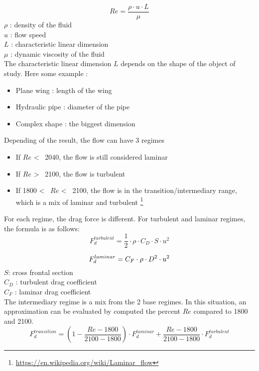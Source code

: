 \documentclass[12pt,a4paper]{article}
\begin{document}
	\begin{equation}
		Re = \frac{\rho \cdot u \cdot L}{\mu}
	\end{equation}
	$\rho$ : density of the fluid\\
	$u$ : flow speed\\
	$L$ : characteristic linear dimension\\
	$\mu$ : dynamic viscosity of the fluid\\
	
	The characteristic linear dimension $L$ depends on the shape of the object of study. Here some example : 
	\begin{itemize}
		\item Plane wing : length of the wing
		\item Hydraulic pipe : diameter of the pipe
		\item Complex shape : the biggest dimension
	\end{itemize}
	Depending of the result, the flow can have 3 regimes
	
	\begin{itemize}
		\item If $Re$ <~ 2040, the flow is still considered laminar 
		\item If $Re$ >~ 2100, the flow is turbulent
		\item If 1800 <~ $Re$ <~ 2100, the flow is in the transition/intermediary range, which is a mix of laminar and turbulent \footnote{\url{https://en.wikipedia.org/wiki/Laminar_flow}}
	\end{itemize}
	
	For each regime, the drag force is different. 
	For turbulent and laminar regimes, the formula is as follows:
	\begin{equation}
		F_d^{turbulent} = \frac{1}{2} \cdot \rho \cdot C_D \cdot S \cdot u^2
	\end{equation}
	
	\begin{equation}
		F_d^{laminar} = C_F \cdot \rho \cdot  D^2 \cdot u^2\\
	\end{equation}
	$S$: cross frontal section\\
	$C_D$ : turbulent drag coefficient\\
	$C_F$ : laminar drag coefficient\\
	
	The intermediary regime is a mix from the 2 base regimes. In this situation, an approximation can be evaluated by computed the percent $Re$ compared to 1800 and 2100. 
	\begin{equation}
		F_d^{transition} = (1- \frac{Re - 1800}{2100-1800}) \cdot F_d^{laminar} + \frac{Re - 1800}{2100-1800} \cdot F_d^{turbulent}
	\end{equation}
	
\end{document}

